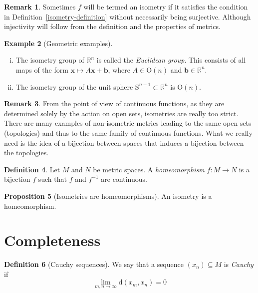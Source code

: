 \documentclass[10pt,fleqn]{article}
\newcommand{\met}{\mathrm{d}}
\newcommand{\reals}{\mathbb{R}}
\newcommand{\vc}[1]{\boldsymbol{#1}}
\theoremstyle{definition} \newtheorem{defn}{Definition}[section]
\theoremstyle{plain}      \newtheorem{thm}[defn]{Theorem}
\theoremstyle{definition} \newtheorem{prop}[defn]{Proposition}
\theoremstyle{definition} \newtheorem{cor}[defn]{Corollary}
\theoremstyle{definition} \newtheorem{ex}[defn]{Example}
\theoremstyle{definition} \newtheorem{rem}[defn]{Remark}
\begin{document}
\begin{rem}
    Sometimes $f$ will be termed an isometry if it satisfies the condition in Definition~\ref{isometry-definition} without necessarily being surjective. Although injectivity will follow from the definition and the properties of metrics.
\end{rem}

\begin{ex}[Geometric examples]
    \begin{enumerate}[(i)]
        \item The isometry group of $\reals^n$ is called the \emph{Euclidean group}.
        This consists of all maps of the form \mbox{$\vc{x}\mapsto A\vc{x}+\vc{b}$}, where $A\in\mathrm{O}(n)$ and $\vc{b}\in\reals^n$.
        \item The isometry group of the unit sphere $\mathrm{S}^{n-1}\subset\reals^n$ is $\mathrm{O}(n)$.
    \end{enumerate}
\end{ex}

\begin{rem}
    From the point of view of continuous functions, as they are determined solely by the action on open sets, isometries are really too strict.
    There are many examples of non-isometric metrics leading to the same open sets (topologies) and thus to the same family of continuous functions.
    What we really need is the idea of a bijection between spaces that induces a bijection between the topologies.
\end{rem}

\begin{defn}
    Let $M$ and $N$ be metric spaces.
    A \emph{homeomorphism} \mbox{$f:M\to N$} is a bijection $f$ such that $f$ and $f^{-1}$ are continuous.
\end{defn}

\begin{prop}[Isometries are homeomorphisms]
    An isometry is a homeomorphism.
\end{prop}


\section{Completeness}

\begin{defn}[Cauchy sequences]
    We say that a sequence $(x_n)\subseteq M$ is \emph{Cauchy} if
    \[
        \lim_{m,n\to\infty}\met(x_m,x_n)=0
    \]
\end{defn}
\end{document}
